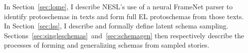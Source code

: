 In Section~\ref{sec:lome}, I describe NESL's use of a neural FrameNet parser to identify protoschemas in texts and form full EL protoschemas from those texts. In Section~\ref{sec:lss}, I describe and formally define latent schema sampling. Sections~\ref{sec:singleschemas}~and~\ref{sec:schemagen} then respectively describe the processes of forming and generalizing schemas from sampled stories.



